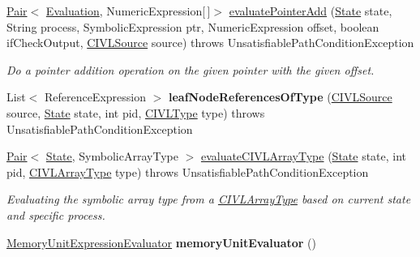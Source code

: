 \begin{DoxyCompactItemize}
\hyperlink{classedu_1_1udel_1_1cis_1_1vsl_1_1civl_1_1util_1_1IF_1_1Pair}{Pair}$<$ \hyperlink{classedu_1_1udel_1_1cis_1_1vsl_1_1civl_1_1semantics_1_1IF_1_1Evaluation}{Evaluation}, Numeric\+Expression\mbox{[}$\,$\mbox{]}$>$ \hyperlink{classedu_1_1udel_1_1cis_1_1vsl_1_1civl_1_1semantics_1_1common_1_1CommonEvaluator_a12e5329977df322e97c239871f8177d8}{evaluate\+Pointer\+Add} (\hyperlink{interfaceedu_1_1udel_1_1cis_1_1vsl_1_1civl_1_1state_1_1IF_1_1State}{State} state, String process, Symbolic\+Expression ptr, Numeric\+Expression offset, boolean if\+Check\+Output, \hyperlink{interfaceedu_1_1udel_1_1cis_1_1vsl_1_1civl_1_1model_1_1IF_1_1CIVLSource}{C\+I\+V\+L\+Source} source)  throws Unsatisfiable\+Path\+Condition\+Exception 
\begin{DoxyCompactList}\small\item\em Do a pointer addition operation on the given pointer with the given offset. \end{DoxyCompactList}\item 
\hypertarget{classedu_1_1udel_1_1cis_1_1vsl_1_1civl_1_1semantics_1_1common_1_1CommonEvaluator_ae45883dc123e2be72a7206c4bbbd4dc4}{}List$<$ Reference\+Expression $>$ {\bfseries leaf\+Node\+References\+Of\+Type} (\hyperlink{interfaceedu_1_1udel_1_1cis_1_1vsl_1_1civl_1_1model_1_1IF_1_1CIVLSource}{C\+I\+V\+L\+Source} source, \hyperlink{interfaceedu_1_1udel_1_1cis_1_1vsl_1_1civl_1_1state_1_1IF_1_1State}{State} state, int pid, \hyperlink{interfaceedu_1_1udel_1_1cis_1_1vsl_1_1civl_1_1model_1_1IF_1_1type_1_1CIVLType}{C\+I\+V\+L\+Type} type)  throws Unsatisfiable\+Path\+Condition\+Exception \label{classedu_1_1udel_1_1cis_1_1vsl_1_1civl_1_1semantics_1_1common_1_1CommonEvaluator_ae45883dc123e2be72a7206c4bbbd4dc4}

\item 
\hyperlink{classedu_1_1udel_1_1cis_1_1vsl_1_1civl_1_1util_1_1IF_1_1Pair}{Pair}$<$ \hyperlink{interfaceedu_1_1udel_1_1cis_1_1vsl_1_1civl_1_1state_1_1IF_1_1State}{State}, Symbolic\+Array\+Type $>$ \hyperlink{classedu_1_1udel_1_1cis_1_1vsl_1_1civl_1_1semantics_1_1common_1_1CommonEvaluator_a37563637a31ec9f55ea6cecff2873d33}{evaluate\+C\+I\+V\+L\+Array\+Type} (\hyperlink{interfaceedu_1_1udel_1_1cis_1_1vsl_1_1civl_1_1state_1_1IF_1_1State}{State} state, int pid, \hyperlink{interfaceedu_1_1udel_1_1cis_1_1vsl_1_1civl_1_1model_1_1IF_1_1type_1_1CIVLArrayType}{C\+I\+V\+L\+Array\+Type} type)  throws Unsatisfiable\+Path\+Condition\+Exception 
\begin{DoxyCompactList}\small\item\em Evaluating the symbolic array type from a \hyperlink{}{C\+I\+V\+L\+Array\+Type} based on current state and specific process. \end{DoxyCompactList}\item 
\hypertarget{classedu_1_1udel_1_1cis_1_1vsl_1_1civl_1_1semantics_1_1common_1_1CommonEvaluator_aa7dbbb213e93668cebd0abd23c2bbdb0}{}\hyperlink{interfaceedu_1_1udel_1_1cis_1_1vsl_1_1civl_1_1semantics_1_1IF_1_1MemoryUnitExpressionEvaluator}{Memory\+Unit\+Expression\+Evaluator} {\bfseries memory\+Unit\+Evaluator} ()\label{classedu_1_1udel_1_1cis_1_1vsl_1_1civl_1_1semantics_1_1common_1_1CommonEvaluator_aa7dbbb213e93668cebd0abd23c2bbdb0}


\end{DoxyCompactItemize}

